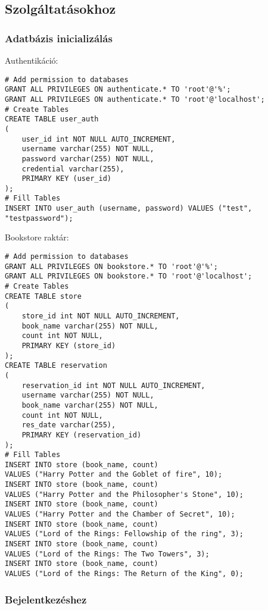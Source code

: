 \subsection{Szolgáltatásokhoz}\label{szolguxe1ltatuxe1sokhoz}

\subsubsection{Adatbázis
inicializálás}\label{adatbuxe1zis-inicializuxe1luxe1s}

Authentikáció:

\begin{verbatim}
# Add permission to databases
GRANT ALL PRIVILEGES ON authenticate.* TO 'root'@'%';
GRANT ALL PRIVILEGES ON authenticate.* TO 'root'@'localhost';
# Create Tables
CREATE TABLE user_auth
(
    user_id int NOT NULL AUTO_INCREMENT,
    username varchar(255) NOT NULL,
    password varchar(255) NOT NULL,
    credential varchar(255),
    PRIMARY KEY (user_id)
);
# Fill Tables
INSERT INTO user_auth (username, password) VALUES ("test", "testpassword");
\end{verbatim}

Bookstore raktár:

\begin{verbatim}
# Add permission to databases
GRANT ALL PRIVILEGES ON bookstore.* TO 'root'@'%';
GRANT ALL PRIVILEGES ON bookstore.* TO 'root'@'localhost';
# Create Tables
CREATE TABLE store
(
    store_id int NOT NULL AUTO_INCREMENT,
    book_name varchar(255) NOT NULL,
    count int NOT NULL,
    PRIMARY KEY (store_id)
);
CREATE TABLE reservation
(
    reservation_id int NOT NULL AUTO_INCREMENT,
    username varchar(255) NOT NULL,
    book_name varchar(255) NOT NULL,
    count int NOT NULL,
    res_date varchar(255),
    PRIMARY KEY (reservation_id)
);
# Fill Tables
INSERT INTO store (book_name, count)
VALUES ("Harry Potter and the Goblet of fire", 10);
INSERT INTO store (book_name, count)
VALUES ("Harry Potter and the Philosopher's Stone", 10);
INSERT INTO store (book_name, count)
VALUES ("Harry Potter and the Chamber of Secret", 10);
INSERT INTO store (book_name, count)
VALUES ("Lord of the Rings: Fellowship of the ring", 3);
INSERT INTO store (book_name, count)
VALUES ("Lord of the Rings: The Two Towers", 3);
INSERT INTO store (book_name, count)
VALUES ("Lord of the Rings: The Return of the King", 0);
\end{verbatim}

\subsubsection{Bejelentkezéshez}\label{bejelentkezuxe9shez}

